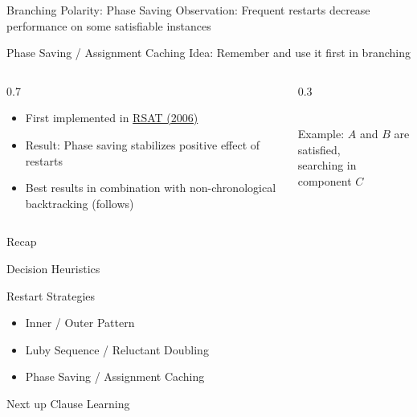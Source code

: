 \documentclass[t]{sdqbeamer}
\begin{document}
\begin{frame}{Branching Polarity: Phase Saving}
Observation: Frequent {restarts} decrease performance on some satisfiable instances\\[1em]
\begin{blueblock}{Phase Saving / Assignment Caching}
Idea: Remember  and use it first in branching\\[1ex]
\begin{columns}[T]
\begin{column}{0.7\textwidth}
\begin{itemize}\setlength{\itemsep}{1em}
	\item First implemented in \href{http://reasoning.cs.ucla.edu/rsat/}{RSAT (2006)}
	\item Result: Phase saving stabilizes positive effect of restarts
	\item Best results in combination with non-chronological backtracking (follows)
\end{itemize}
\end{column}
\begin{column}{0.3\textwidth}
\centering
{}~\\
Example: $A$ and $B$ are satisfied,\\ searching in component $C$
\end{column}
\end{columns}
\end{blueblock}
\end{frame}

\begin{frame}{Recap}
	\begin{block}{Decision Heuristics}
	\end{block}
	\begin{block}{Restart Strategies}
		\begin{itemize}\setlength{\itemsep}{1ex}
			\item Inner / Outer Pattern
			\item Luby Sequence / Reluctant Doubling
			\item Phase Saving / Assignment Caching
		\end{itemize}
	\end{block}
	\begin{block}{Next up}
		Clause Learning
	\end{block}
\end{frame}
\end{document}
